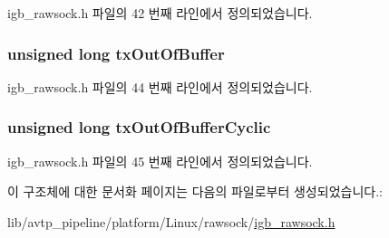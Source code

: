 igb\+\_\+rawsock.\+h 파일의 42 번째 라인에서 정의되었습니다.

\subsubsection[{\texorpdfstring{tx\+Out\+Of\+Buffer}{txOutOfBuffer}}]{\setlength{\rightskip}{0pt plus 5cm}unsigned long tx\+Out\+Of\+Buffer}\hypertarget{structigb__rawsock__t_a93b332533b50c7524d3eb7fc03a8df7a}{}\label{structigb__rawsock__t_a93b332533b50c7524d3eb7fc03a8df7a}


igb\+\_\+rawsock.\+h 파일의 44 번째 라인에서 정의되었습니다.

\subsubsection[{\texorpdfstring{tx\+Out\+Of\+Buffer\+Cyclic}{txOutOfBufferCyclic}}]{\setlength{\rightskip}{0pt plus 5cm}unsigned long tx\+Out\+Of\+Buffer\+Cyclic}\hypertarget{structigb__rawsock__t_ab72f6e390a1b3447a247f4c70c6ff8d0}{}\label{structigb__rawsock__t_ab72f6e390a1b3447a247f4c70c6ff8d0}


igb\+\_\+rawsock.\+h 파일의 45 번째 라인에서 정의되었습니다.



이 구조체에 대한 문서화 페이지는 다음의 파일로부터 생성되었습니다.\+:\begin{DoxyCompactItemize}
\item 
lib/avtp\+\_\+pipeline/platform/\+Linux/rawsock/\hyperlink{igb__rawsock_8h}{igb\+\_\+rawsock.\+h}\end{DoxyCompactItemize}
